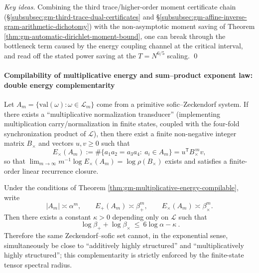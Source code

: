 \begin{proposition}
\begin{proof}[Key ideas]
Combining the third trace/higher-order moment certificate chain (\S\ref{subsubsec:gm-third-trace-dual-certificates} and \S\ref{subsubsec:gm-affine-inverse-gram-arithmetic-dichotomy}) with the non-asymptotic moment saving of Theorem \ref{thm:gm-automatic-dirichlet-moment-bound}, one can break through the bottleneck term caused by the energy coupling channel at the critical interval, and read off the stated power saving at the \(T=N^{6/5}\) scaling. \qed
\end{proof}

\paragraph{Compilability of multiplicative energy and sum--product exponent law: double energy complementarity}
\begin{theorem}\label{thm:gm-multiplicative-energy-compilable}
Let \(A_m=\{\mathrm{val}(\omega):\omega\in\mathcal{L}_m\}\) come from a primitive sofic--Zeckendorf system.
If there exists a ``multiplicative normalization transducer'' (implementing multiplication carry/normalization in finite states, coupled with the four-fold synchronization product of \(\mathcal{L}\)), then there exist a finite non-negative integer matrix \(B_{\times}\) and vectors \(u,v\ge 0\) such that
\[
E_{\times}(A_m):=\#\{a_1a_2=a_3a_4:\ a_i\in A_m\}
=u^{\mathsf T}B_{\times}^{\,m}v,
\]
so that \(\lim_{m\to\infty}m^{-1}\log E_\times(A_m)=\log\rho(B_\times)\) exists and satisfies a finite-order linear recurrence closure.
\end{theorem}

\begin{theorem}\label{thm:gm-add-mult-energy-complementarity}
Under the conditions of Theorem \ref{thm:gm-multiplicative-energy-compilable}, write
\[
|A_m|\asymp \alpha^m,\qquad
E_+(A_m)\asymp \beta_+^m,\qquad
E_\times(A_m)\asymp \beta_\times^m.
\]
Then there exists a constant \(\kappa>0\) depending only on \(\mathcal{L}\) such that
\[
\boxed{\ \log\beta_+ + \log\beta_\times\ \le\ 6\log\alpha-\kappa\ }.
\]
Therefore the same Zeckendorf--sofic set cannot, in the exponential sense, simultaneously be close to ``additively highly structured'' and ``multiplicatively highly structured''; this complementarity is strictly enforced by the finite-state tensor spectral radius.
\end{theorem}


\end{proposition}
